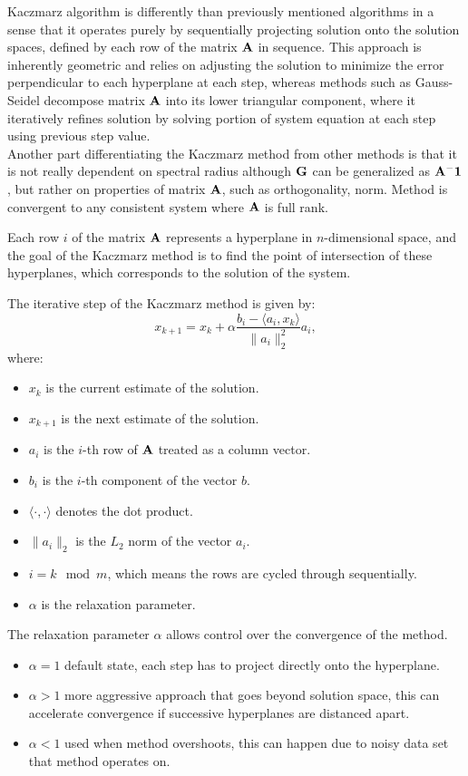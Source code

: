Kaczmarz algorithm is differently than previously mentioned algorithms in a sense 
that it operates purely by sequentially projecting solution onto the solution spaces,
defined by each row of the matrix $\mathbf{A}$ in sequence. 
This approach is inherently geometric and relies on adjusting the solution to minimize 
the error perpendicular to each hyperplane at each step, whereas methods such as Gauss-Seidel decompose matrix $\mathbf{A}$ into its lower triangular component, 
where it iteratively refines solution by solving portion of system equation at each step using previous step value.\\
Another part differentiating the Kaczmarz method from other methods is that it is not really dependent on spectral radius although $\mathbf{G}$ can be generalized as $\mathbf{A^-1}$, but rather on properties of matrix $\mathbf{A}$, 
such as orthogonality, norm. Method is convergent to any consistent system where $\mathbf{A}$ is full rank.


Each row $i$ of the matrix $\mathbf{A}$ represents a hyperplane in $n$-dimensional space, and the goal of the Kaczmarz method is to find the point of intersection of these hyperplanes, which corresponds to the solution of the system.

The iterative step of the Kaczmarz method is given by:
\begin{equation}
    x_{k+1} = x_{k} + \alpha \frac{b_{i} - \langle a_{i}, x_{k} \rangle}{\|a_{i}\|_{2}^{2}} a_{i},
\end{equation}
where:
\begin{itemize}
    \item $x_{k}$ is the current estimate of the solution.
    \item $x_{k+1}$ is the next estimate of the solution.
    \item $a_{i}$ is the \(i\)-th row of $\mathbf{A}$ treated as a column vector.
    \item $b_{i}$ is the \(i\)-th component of the vector \(b\).
    \item $\langle \cdot, \cdot \rangle$ denotes the dot product.
    \item $\|a_{i}\|_{2}$ is the \(L_2\) norm of the vector \(a_{i}\).
    \item $i = k \mod m$, which means the rows are cycled through sequentially.
    \item $\alpha$ is the relaxation parameter.
\end{itemize}



The relaxation parameter $\alpha$ allows control over the convergence of the method. 
\begin{itemize}
    \item $\alpha = 1$ default state, each step has to project directly onto the hyperplane.
    \item $\alpha > 1$ more aggressive approach that goes beyond solution space, this can accelerate convergence if successive hyperplanes are distanced apart.
    \item $\alpha < 1$ used when method overshoots, this can happen due to noisy data set that method operates on. 
\end{itemize}
